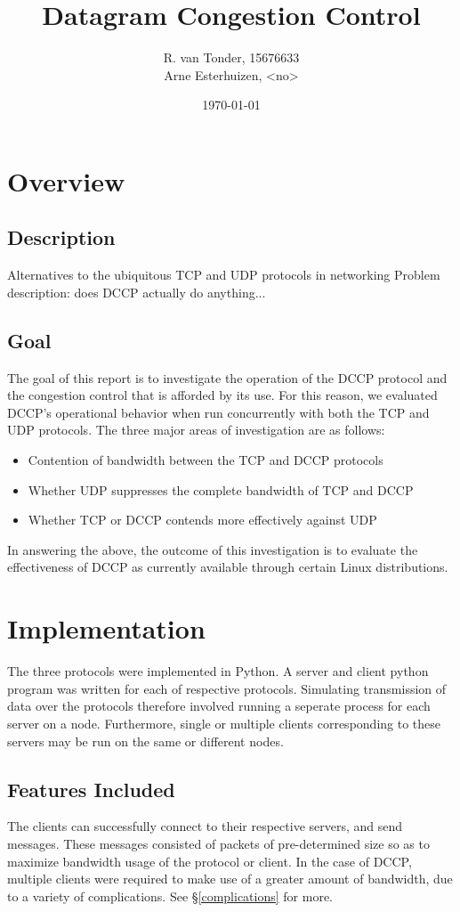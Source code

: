 \documentclass[10pt,a4paper]{article}
\title{Datagram Congestion Control}
\author{R. van Tonder, 15676633 \\ Arne Esterhuizen, <no>} %
\date{\today}
\begin{document}
\maketitle
\newpage

\section{Overview}
\subsection{Description}
Alternatives to the ubiquitous TCP and UDP protocols in networking 
Problem description: does DCCP actually do anything...

\subsection{Goal}
\label{goals}
The goal of this report is to investigate the operation of the DCCP protocol and the congestion control that is afforded
by its use. For this reason, we evaluated DCCP's operational behavior when run concurrently with both the TCP and UDP protocols. 
The three major areas of investigation are as follows:
\begin{itemize}
\item Contention of bandwidth between the TCP and DCCP protocols
\item Whether UDP suppresses the complete bandwidth of TCP and DCCP
\item Whether TCP or DCCP contends more effectively against UDP
\end{itemize}
In answering the above, the outcome of this investigation is to evaluate the effectiveness of DCCP as currently available through 
certain Linux distributions. 


\section{Implementation}
The three protocols were implemented in Python. A server and client python program was written for each
of respective protocols. Simulating transmission of data over the protocols therefore involved running a
seperate process for each server on a node. Furthermore, single or multiple clients corresponding to these
servers may be run on the same or different nodes.

\subsection{Features Included}
The clients can successfully connect to their respective servers, and send messages. These messages consisted of packets
of pre-determined size so as to maximize bandwidth usage of the protocol or client. In the case of DCCP, multiple clients were required
to make use of a greater amount of bandwidth, due to a variety of complications. See \S\ref{complications} for more. 
\end{document}
